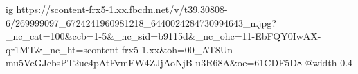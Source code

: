  
 
 
 
 

\ifcmt
  ig https://scontent-frx5-1.xx.fbcdn.net/v/t39.30808-6/269999097_6724241960981218_6440024284730994643_n.jpg?_nc_cat=100&ccb=1-5&_nc_sid=b9115d&_nc_ohc=11-EbFQY0IwAX-qr1MT&_nc_ht=scontent-frx5-1.xx&oh=00_AT8Un-mu5VeGJcbsPT2ue4pAtFvmFW4ZJjAoNjB-u3R68A&oe=61CDF5D8
  @width 0.4
\fi
